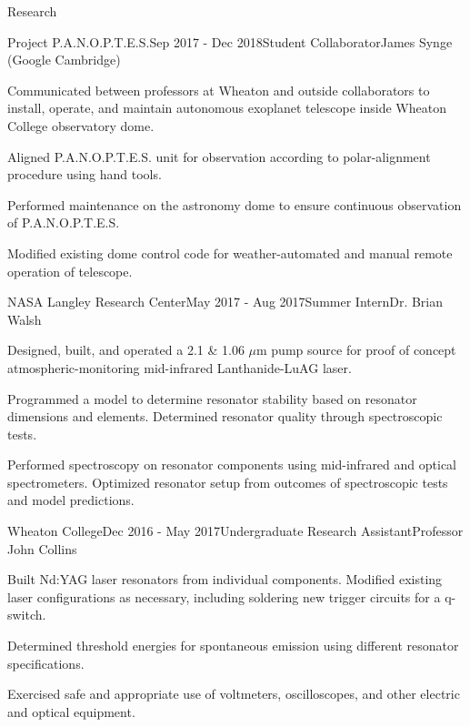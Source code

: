 \documentclass{resume} %
\begin{document}
\begin{rSection}{Research}
\begin{rSubsection}{Project P.A.N.O.P.T.E.S.}{Sep 2017 - Dec 2018}{Student Collaborator}{James Synge (Google Cambridge)}
\item Communicated between professors at Wheaton and outside collaborators to install, operate, and maintain autonomous exoplanet telescope inside Wheaton College observatory dome.
\item Aligned P.A.N.O.P.T.E.S. unit for observation according to polar-alignment procedure using hand tools.
\item Performed maintenance on the astronomy dome to ensure continuous observation of P.A.N.O.P.T.E.S.
\item Modified existing dome control code for weather-automated and manual remote operation of telescope.
\end{rSubsection}
\begin{rSubsection}{NASA Langley Research Center}{May 2017 - Aug 2017}{Summer Intern}{Dr. Brian Walsh}
\item Designed, built, and operated a 2.1 \& 1.06 $\mu$m pump source for proof of concept atmospheric-monitoring mid-infrared Lanthanide-LuAG laser.
\item Programmed a model to determine resonator stability based on resonator dimensions and elements. Determined resonator quality through spectroscopic tests.
\item Performed spectroscopy on resonator components using mid-infrared and optical spectrometers. Optimized resonator setup from outcomes of spectroscopic tests and model predictions.
\end{rSubsection}

\begin{rSubsection}{Wheaton College}{Dec 2016 - May 2017}{Undergraduate Research Assistant}{Professor John Collins}
\item Built Nd:YAG laser resonators from individual components. Modified existing laser configurations as necessary, including soldering new trigger circuits for a q-switch.
\item  Determined threshold energies for spontaneous emission using different resonator specifications.
\item Exercised safe and appropriate use of voltmeters, oscilloscopes, and other electric and optical equipment.
\end{rSubsection}

\end{rSection}
\end{document}
